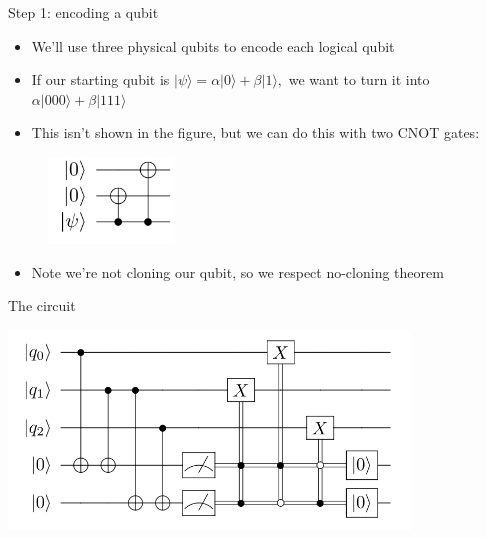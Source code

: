 \documentclass[aspectratio=169, handout]{beamer}
\begin{document}
\begin{frame}{Step 1: encoding a qubit}
    \begin{itemize}
        \item We'll use three physical qubits to encode each logical qubit \pause
        \item If our starting qubit is $|\psi\rangle = \alpha|0\rangle + \beta|1\rangle,$ we want to turn it into $\alpha|000\rangle + \beta|111\rangle$ \pause
        \item This isn't shown in the figure, but we can do this with two CNOT gates:
    \end{itemize}
    \begin{figure}
        \centering
        \includegraphics[width=0.3\textwidth]{kintroduction-to-classical-and-quantum-computing-1e3p 2023-10-09 20_15_18.png}
    \end{figure} \pause
    \begin{itemize}
        \item Note we're not cloning our qubit, so we respect no-cloning theorem
    \end{itemize}
\end{frame}

\begin{frame}{The circuit}
\begin{center}
    \includegraphics[width=0.8\textwidth]{bitflipcode.png}\nocite{site:xkcd}
\end{center}
\end{frame}
\end{document}
